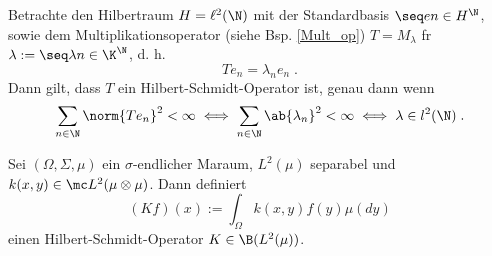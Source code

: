 \begin{ex}
	Betrachte den Hilbertraum \(H = \ell^2(\N)\) mit der Standardbasis \(\seq en \in H^\N\), sowie dem Multiplikationsoperator (siehe Bsp. \ref{Mult_op}) \(T = M_\lambda\) f\us r \(\lambda := \seq \lambda n \in \K^\N\), d. h. 
	\[T e_n = \lambda_n e_n\;.\]
	Dann gilt, dass $T$ ein Hilbert-Schmidt-Operator ist, genau dann wenn
	\[\sum_{n\in\N}\norm{Te_n}^2 < \infty \iff \sum_{n\in\N}\ab{\lambda_n}^2 < \infty \iff \lambda \in l^2(\N)\;.\]
\end{ex}

\begin{theorem}
	Sei \((\Omega, \Sigma, \mu)\) ein \(\sigma\)-endlicher Ma\s raum, \(L^2(\mu)\) separabel und \(k(x,y)\in \mc L^2(\mu\otimes \mu)\). Dann definiert 
	\[(K f)(x) := \int_\Omega k(x,y) f(y) \mu (dy)\]
	einen Hilbert-Schmidt-Operator \(K\in \B(L^2(\mu))\).
\end{theorem}
